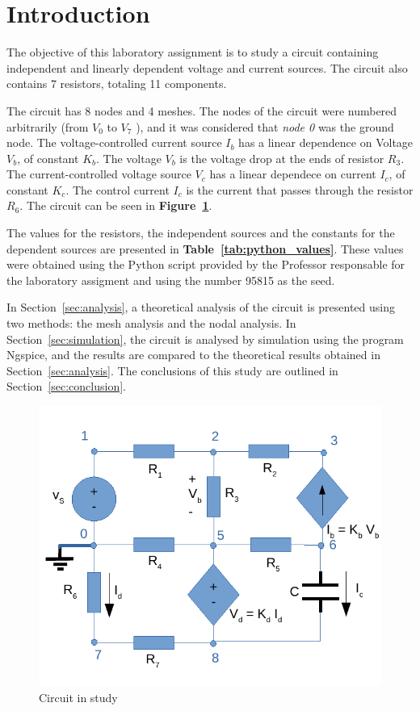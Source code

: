 \section{Introduction}
\label{sec:introduction}

\par The objective of this laboratory assignment is to study a circuit containing independent and 
linearly dependent voltage and current sources. The circuit also contains 7 resistors, totaling 11 components.\par
The circuit has 8 nodes and 4 meshes. The nodes of the circuit were numbered arbitrarily (from {\it$V_{0}$}  to {\it$V_{7}$} ), and it was considered that {\it node 0} was the ground node. The voltage-controlled current source {\it $I_b$} has a linear dependence on Voltage {\it $V_b$}, of constant {\it $K_b$}. The voltage {\it $V_b$} is the voltage drop at the ends of resistor {\it $R_3$}. The current-controlled voltage source {\it $V_c$} has a linear dependece on current {\it $I_c$}, of constant {\it $K_c$}. The control current {\it $I_c$} is the current that passes through the resistor {\it $R_6$}.
The circuit can be seen in \textbf{Figure~\ref{fig:circuit_t2}}.\par
The values for the resistors, the independent sources and the  constants for the dependent 
sources are presented in \textbf{Table~\ref{tab:python_values}}. These values were obtained using the
Python script provided by the Professor responsable for the laboratory assigment
and using the number 95815 as the seed.\par

In Section~\ref{sec:analysis}, a theoretical analysis of the circuit is
presented using two methods: the mesh analysis and the nodal analysis. In Section~\ref{sec:simulation}, the circuit is analysed by
simulation using the program Ngspice, and the results are compared to the theoretical results obtained in
Section~\ref{sec:analysis}. The conclusions of this study are outlined in
Section~\ref{sec:conclusion}.

\begin{figure}[h] \centering
\includegraphics[width=0.9\linewidth]{circuit_t2.pdf}
\caption{Circuit in study}
\label{fig:circuit_t2}
\end{figure}


